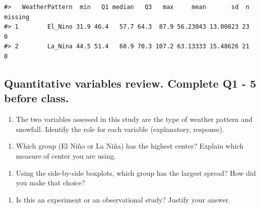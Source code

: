 \documentclass[
]{report}
\providecommand{\tightlist}{%
  \setlength{\itemsep}{0pt}\setlength{\parskip}{0pt}}
\begin{document}
\begin{verbatim}
#>   WeatherPattern  min   Q1 median   Q3   max     mean       sd  n missing
#> 1        El_Nino 31.9 46.4   57.7 64.3  87.9 56.23043 13.00823 23       0
#> 2        La_Nina 44.5 51.4   60.9 70.3 107.2 63.13333 15.48626 21       0
\end{verbatim}

\hypertarget{quantitative-variables-review.-complete-q1---5-before-class.}{%
\subsection*{Quantitative variables review. Complete Q1 - 5 before class.}\label{quantitative-variables-review.-complete-q1---5-before-class.}}

\begin{enumerate}
\def\labelenumi{\arabic{enumi}.}
\tightlist
\item
  The two variables assessed in this study are the type of weather pattern and snowfall. Identify the role for each variable (explanatory, response).
\end{enumerate}

\vspace{.6in}

\begin{enumerate}
\def\labelenumi{\arabic{enumi}.}
\setcounter{enumi}{1}
\tightlist
\item
  Which group (El Ni\~{n}o or La Ni\~{n}a) has the highest center? Explain which measure of center you are using.
\end{enumerate}

\vspace{.6in}

\begin{enumerate}
\def\labelenumi{\arabic{enumi}.}
\setcounter{enumi}{2}
\tightlist
\item
  Using the side-by-side boxplots, which group has the largest spread? How did you make that choice?
\end{enumerate}

\vspace{.6in}

\newpage

\begin{enumerate}
\def\labelenumi{\arabic{enumi}.}
\setcounter{enumi}{3}
\tightlist
\item
  Is this an experiment or an observational study? Justify your answer.
\end{enumerate}
\end{document}
